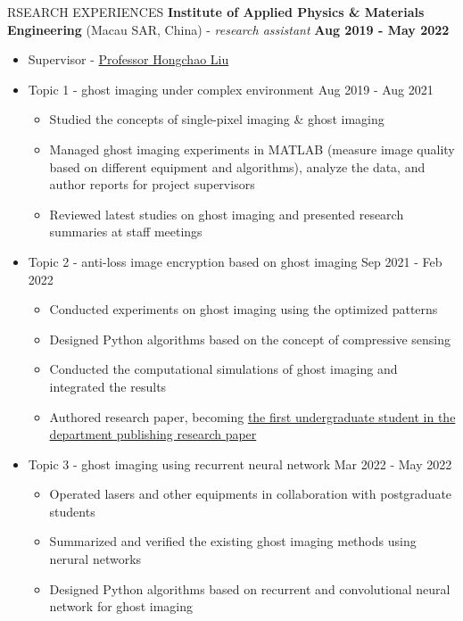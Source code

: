 \documentclass[11pt]{article}
\begin{document}
\begin{section}{RSEARCH EXPERIENCES}
\textbf{Institute of Applied Physics \& Materials Engineering} (Macau SAR, China) - \textit{research assistant} \hfill \textbf{Aug 2019 - May 2022}
\begin{itemize}[leftmargin=1.5em]
    \item Supervisor - \href{mailto:hcliu@um.edu.mo}{Professor Hongchao Liu}
    \item Topic 1 - ghost imaging under complex environment  \hfill Aug 2019 - Aug 2021
    \begin{itemize}[leftmargin=1.5em]
        \item Studied the concepts of single-pixel imaging \& ghost imaging
        \item Managed ghost imaging experiments in MATLAB (measure image quality based on different equipment and algorithms), analyze the data, and author reports for project supervisors
        \item Reviewed latest studies on ghost imaging and presented research summaries at staff meetings
    \end{itemize}
    \item Topic 2 - anti-loss image encryption based on ghost imaging \hfill Sep 2021 - Feb 2022
    \begin{itemize}[leftmargin=1.5em]
        \item Conducted experiments on ghost imaging using the optimized patterns 
        \item Designed Python algorithms based on the concept of compressive sensing 
        \item Conducted the computational simulations of ghost imaging and integrated the results
        \item Authored research paper, becoming \href{https://www.tdm.com.mo/en/news-detail/683438?isvideo=false&lang=en&category=all}{the first undergraduate student in the department publishing research paper} 
    \end{itemize}
    \item Topic 3 - ghost imaging using recurrent neural network  \hfill Mar 2022 - May 2022
    \begin{itemize}[leftmargin=1.5em]
        \item Operated lasers and other equipments in collaboration with postgraduate students
        \item Summarized and verified the existing ghost imaging methods using nerural networks
        \item Designed Python algorithms based on recurrent and convolutional neural network for ghost imaging 
    \end{itemize}
\end{itemize}

\end{section}
\end{document}
